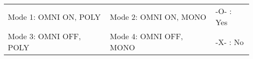    \begin{table}[htb]
      \label{table:midi_impl_chart_bottom}
      \begin{tabular}{l l l}
         Mode 1: OMNI ON, POLY  & Mode 2: OMNI ON, MONO  & -O- : Yes \\
         Mode 3: OMNI OFF, POLY & Mode 4: OMNI OFF, MONO & -X- : No  \\
      \end{tabular}
   \end{table}


